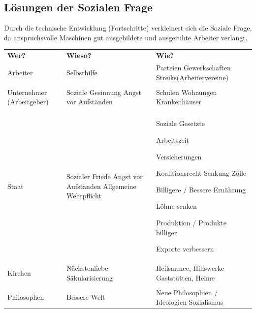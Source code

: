 \documentclass[10pt, openright=true]{scrartcl}
\begin{document}
\subsection{Lösungen der Sozialen Frage}
Durch die technische Entwicklung (Fortschritte) verkleinert sich die Soziale Frage, da anspruchsvolle Maschinen gut ausgebildete und ausgeruhte Arbeiter verlangt.\\
\begin{tabularx}{1\textwidth}{L{3cm} L{4cm}  X}
 \textbf{Wer?} & \textbf{Wieso?} & \textbf{Wie?}\\ 
Arbeiter & Selbsthilfe & Parteien \newline Gewerkschaften \newline Streiks(Arbeitervereine)\\
\\
 Unternehmer \newline (Arbeitgeber) & Soziale Gesinnung \newline Angst vor Aufständen & Schulen \newline Wohnungen \newline Krankenhäuser \\
\\
Staat & Sozialer Friede \newline Angst vor Aufständen \newline Allgemeine Wehrpflicht & Soziale Gesetzte 
\begin{citemize} 
\item Arbeitszeit 
\item Versicherungen 
\end{citemize}
 Koalitionsrecht \newline Senkung Zölle 
\begin{citemize} 
\item Billigere / Bessere Ernährung 
\item Löhne senken 
\item Produktion / Produkte billiger 
\item Exporte verbessern 
\end{citemize}\\
 Kirchen & Nächstenliebe \newline Säkularisierung & Heilsarmee, Hilfswerke \newline Gaststätten, Heime\\
\\
Philosophen & Bessere Welt & Neue Philosophien / Ideologien \newline Sozialismus\\
\end{tabularx}
\end{document}
